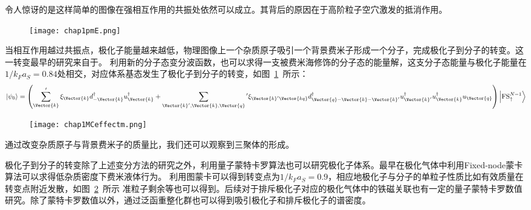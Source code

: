 令人惊讶的是这样简单的图像在强相互作用的共振处依然可以成立。其背后的原因在于高阶粒子空穴激发的抵消作用\cite{Combescot20071ph008full}。
\begin{figure}[!htbp]
    \centering
    \texttt{[image: chap1pmE.png]}
    \label{pmE}
\end{figure}
当相互作用越过共振点，极化子能量越来越低，物理图像上一个杂质原子吸引一个背景费米子形成一个分子，完成极化子到分子的转变。这一转变最早的研究来自于\cite{Mora_pm,Punk_pm,combescot2010analytical,Trefzger2012Impurity}。
利用新的分子态变分波函数，也可以求得一支被费米海修饰的分子态的能量解，这支分子态能量与极化子能量在$1/k_Fa_S=0.84$处相交，对应体系基态发生了极化子到分子的转变，如图~\ref{pmE}~所示：
\begin{equation}
\left|\psi_{0}\right\rangle=\left(\sum_{\Vector{k}}^{\prime} \xi_{\Vector{k}} d_{-\Vector{k}}^{\dagger} u_{\Vector{k}}^{\dagger}+\sum_{\Vector{k}^{\prime}, \Vector{k}, \Vector{q}}{ }^{\prime} \xi_{\Vector{k}^{\prime} \Vector{k q}} d_{\Vector{q}-\Vector{k}-\Vector{k}^{\prime}}^{\dagger} u_{\Vector{k}^{\prime}}^{\dagger} u_{\Vector{k}}^{\dagger} u_{\Vector{q}}\right)\left|\mathrm{FS}_{\uparrow}^{N-1}\right\rangle
\end{equation}

\begin{figure}[!htbp]
    \centering
    \texttt{[image: chap1MCeffectm.png]}
    \label{MCeffectm}
\end{figure}
通过改变杂质原子与背景费米子的质量比，我们还可以观察到三聚体的形成\cite{Mathy2011trimers}。

极化子到分子的转变除了上述变分方法的研究之外，利用量子蒙特卡罗算法也可以研究极化子体系。最早在极化气体中利用Fixed-node蒙卡算法可以求得低杂质密度下费米液体行为\cite{Pilati2008phase}。 利用图蒙卡可以得到转变点为$1/k_Fa_S=0.9$，相应地极化子与分子的单粒子性质比如有效质量在转变点附近发散，如图~\ref{MCeffectm}~所示 准粒子剩余等也可以得到\cite{Prokoffermi,Prokofbold,VlietinckMC}。后续对于排斥极化子对应的极化气体中的铁磁关联也有一定的量子蒙特卡罗数值研究\cite{Conduit2009Inhomo,Pilati2010Itinerant,chang2011ferromagnetism}。除了蒙特卡罗数值以外，通过泛函重整化群也可以得到吸引极化子和排斥极化子的谱密度\cite{Schmidt2011excitation}。

